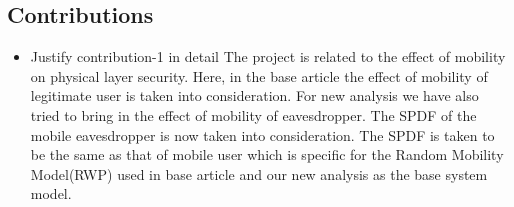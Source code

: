 \documentclass{article}
\begin{document}
    \subsection{Contributions}
\begin{itemize}
\item Justify contribution-1 in detail
\newline
The project is related to the effect of mobility on physical layer security. Here, in the base article the effect of mobility of legitimate user is taken into consideration. For new analysis we have also tried to bring in the effect of mobility of eavesdropper. The SPDF of the mobile eavesdropper is now taken into consideration. The SPDF is taken to be the same as that of mobile user which is specific for the Random Mobility Model(RWP) used in base article and our new analysis as the base system model.
\end{itemize}

\end{document}
